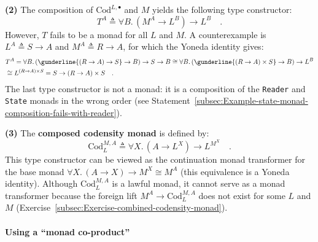 \textbf{(2)} The composition of $\text{Cod}^{L,\bullet}$ and $M$
yields the following type constructor:
\[
T^{A}\triangleq\forall B.\,(M^{A}\rightarrow L^{B})\rightarrow L^{B}\quad.
\]
However, $T$ fails to be a monad for all $L$ and $M$. A counterexample
is $L^{A}\triangleq S\rightarrow A$ and $M^{A}\triangleq R\rightarrow A$,
for which the Yoneda identity gives:
\begin{align*}
 & T^{A}=\forall B.\,(\gunderline{(R\rightarrow A)\rightarrow S}\rightarrow B)\rightarrow S\rightarrow B\cong\forall B.\,(\gunderline{(R\rightarrow A)\times S}\rightarrow B)\rightarrow L^{B}\\
 & \cong L^{(R\rightarrow A)\times S}=S\rightarrow\left(R\rightarrow A\right)\times S\quad.
\end{align*}
The last type constructor is not a monad: it is a composition of the
\lstinline!Reader! and \lstinline!State! monads in the wrong order
(see Statement~\ref{subsec:Example-state-monad-composition-fails-with-reader}).

\textbf{(3)} The \textbf{composed codensity monad}
is defined by:
\[
\text{Cod}_{L}^{M,A}\triangleq\forall X.\,(A\rightarrow L^{X})\rightarrow L^{M^{X}}\quad.
\]
This type constructor can be viewed as the continuation monad transformer
for the base monad $\forall X.\,(A\rightarrow X)\rightarrow M^{X}\cong M^{A}$
(this equivalence is a Yoneda identity). Although $\text{Cod}_{L}^{M,A}$
is a lawful monad, it cannot serve as a monad transformer because
the foreign lift $M^{A}\rightarrow\text{Cod}_{L}^{M,A}$ does not
exist for some $L$ and $M$ (Exercise~\ref{subsec:Exercise-combined-codensity-monad}).

\paragraph{Using a \textquotedblleft monad co-product\textquotedblright}

